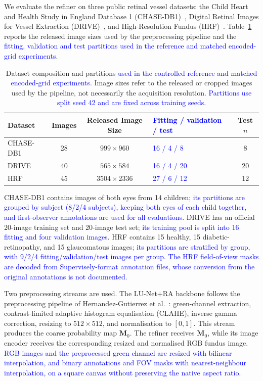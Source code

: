 \documentclass[jimaging,article,submit,pdftex,moreauthors]
  {Definitions/mdpi}
\DeclareRobustCommand{\rev}[1]{\textcolor{blue}{#1}}
\DeclareRobustCommand{\rev}[1]{#1}
\providecommand{\linelabel}[1]{}
\newcommand{\secend}[1]{\linelabel{rev:end:#1}}
\begin{document}
We evaluate the refiner on three public retinal vessel datasets: the Child Heart and Health Study in England Database 1 (CHASE-DB1)~\cite{CHASEDB1}, Digital Retinal Images for Vessel Extraction (DRIVE)~\cite{Staal2004}, and High-Resolution Fundus (HRF)~\cite{Odstrcilik2013HRF}. Table~\ref{tab:datasets} reports the released image sizes used by the preprocessing pipeline and the \rev{fitting, validation and test partitions used in the reference and matched encoded-grid experiments}.

\begin{table}[htbp]
\centering
\caption{Dataset composition and partitions \rev{used in the controlled reference and matched encoded-grid experiments}. Image sizes refer to the released or cropped images used by the pipeline, not necessarily the acquisition resolution. \rev{Partitions use split seed 42 and are fixed across training seeds.}}
\label{tab:datasets}
\small
\begin{tabularx}{\textwidth}{@{}l c c X c@{}}
\toprule
Dataset & Images & Released Image Size & \rev{Fitting / validation / test} & Test $n$ \\
\midrule
CHASE-DB1 & 28 & $999\times960$ & \rev{16 / 4 / 8} & 8 \\
DRIVE & 40 & $565\times584$ & \rev{16 / 4 / 20} & 20 \\
HRF & 45 & $3504\times2336$ & \rev{27 / 6 / 12} & 12 \\
\bottomrule
\end{tabularx}
\end{table}

CHASE-DB1 contains images of both eyes from 14 children\rev{; its partitions are grouped by subject (8/2/4 subjects), keeping both eyes of each child together, and first-observer annotations are used for all evaluations}. DRIVE has an official 20-image training set and 20-image test set\rev{; its training pool is split into 16 fitting and four validation images}. HRF contains 15 healthy, 15 diabetic-retinopathy, and 15 glaucomatous images\rev{; its partitions are stratified by group, with 9/2/4 fitting/validation/test images per group. The HRF field-of-view masks are decoded from Supervisely-format annotation files, whose conversion from the original annotations is not documented.}

Two preprocessing streams are used. The LU-Net+RA backbone follows the preprocessing pipeline of Hernandez-Gutierrez et al.~\cite{Hernandez2025}: green-channel extraction, contrast-limited adaptive histogram equalisation (CLAHE), inverse gamma correction, resizing to $512\times512$, and normalisation to $[0,1]$. This stream produces the coarse probability map $\mathbf{M}_0$. The refiner receives $\mathbf{M}_0$, while its image encoder receives the corresponding resized and normalised RGB fundus image. \rev{RGB images and the preprocessed green channel are resized with bilinear interpolation, and binary annotations and FOV masks with nearest-neighbour interpolation, on a square canvas without preserving the native aspect ratio.}\secend{datasets}
\end{document}
